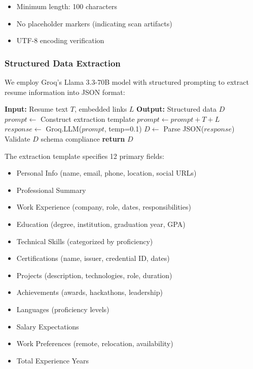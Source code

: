 \documentclass[conference]{IEEEtran}
\begin{document}
\begin{itemize}
    \item Minimum length: 100 characters
    \item No placeholder markers (indicating scan artifacts)
    \item UTF-8 encoding verification
\end{itemize}

\subsubsection{Structured Data Extraction}

We employ Groq's Llama 3.3-70B model with structured prompting to extract resume information into JSON format:

\begin{algorithm}[h]
\caption{LLM-Based Resume Parsing}
\label{alg:resume_parsing}
\begin{algorithmic}[1]
\STATE \textbf{Input:} Resume text $T$, embedded links $L$
\STATE \textbf{Output:} Structured data $D$
\STATE
\STATE $prompt \leftarrow$ Construct extraction template
\STATE $prompt \leftarrow prompt + T + L$
\STATE $response \leftarrow$ Groq.LLM($prompt$, temp=0.1)
\STATE $D \leftarrow$ Parse JSON($response$)
\STATE Validate $D$ schema compliance
\STATE \textbf{return} $D$
\end{algorithmic}
\end{algorithm}

The extraction template specifies 12 primary fields:
\begin{itemize}
    \item Personal Info (name, email, phone, location, social URLs)
    \item Professional Summary
    \item Work Experience (company, role, dates, responsibilities)
    \item Education (degree, institution, graduation year, GPA)
    \item Technical Skills (categorized by proficiency)
    \item Certifications (name, issuer, credential ID, dates)
    \item Projects (description, technologies, role, duration)
    \item Achievements (awards, hackathons, leadership)
    \item Languages (proficiency levels)
    \item Salary Expectations
    \item Work Preferences (remote, relocation, availability)
    \item Total Experience Years
\end{itemize}
\end{document}
